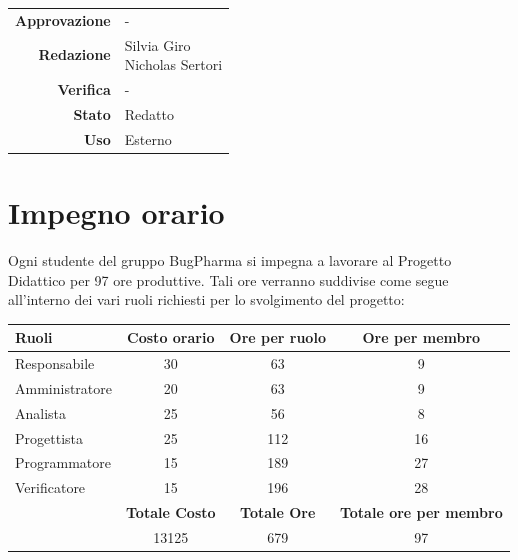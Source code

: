 \documentclass[11pt]{article}
\begin{document}
\begin{titlepage}
\begin{center}
            \large
            
            
            \vfill
            
            \begin{tabular}{r|l}
                \textbf{Approvazione} &  -\\
                \textbf{Redazione} &  \parbox[t]{3.5cm}{Silvia Giro \\Nicholas Sertori }\\
                \textbf{Verifica} &  -\\
                \textbf{Stato} & Redatto \\
                \textbf{Uso} & Esterno
            \end{tabular}
            \vfill
            
        \end{center}
    \end{titlepage}

\maketitle

\tableofcontents
\newpage

\section{Impegno orario}
Ogni studente del gruppo BugPharma si impegna a lavorare al Progetto Didattico per 97 ore produttive.
Tali ore verranno suddivise come segue all'interno dei vari ruoli richiesti per lo svolgimento del progetto: \\

\begin{tabular}{|l|c|c|c|}
\hline
\textbf{Ruoli} & \textbf{Costo orario} & \textbf{Ore per ruolo} & \textbf{Ore per membro}\\
\hline
Responsabile & 30 & 63 & 9\\
\hline
Amministratore & 20 & 63 & 9\\
\hline
Analista & 25 & 56 & 8 \\
\hline
Progettista & 25 & 112 & 16\\
\hline
Programmatore & 15 & 189 & 27\\
\hline
Verificatore & 15 & 196 & 28\\
\hline
            & \textbf{Totale Costo} & \textbf{Totale Ore} & \textbf{Totale ore per membro} \\
\hline
            & \cellcolor{green!25}13125 & 679 & 97 \\
\hline
\end{tabular}  \\
\end{document}
